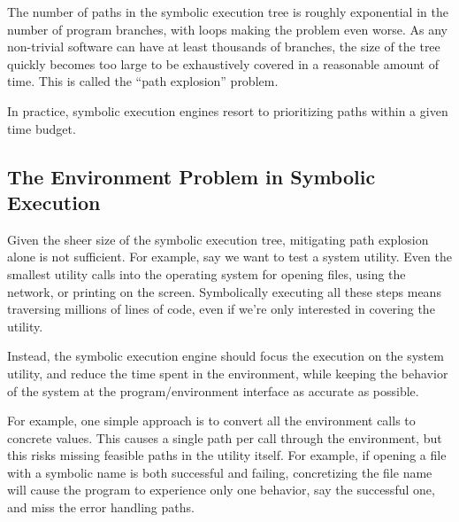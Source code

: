 

The number of paths in the symbolic execution tree is roughly exponential in the number of program branches, with loops making the problem even worse.  As any non-trivial software can have at least thousands of branches, the size of the tree quickly becomes too large to be exhaustively covered in a reasonable amount of time.  This is called the ``path explosion'' problem.

In practice, symbolic execution engines resort to prioritizing paths within a given time budget.


\subsection{The Environment Problem in Symbolic Execution}

Given the sheer size of the symbolic execution tree, mitigating path explosion alone is not sufficient.  For example, say we want to test a system utility.  Even the smallest utility calls into the operating system for opening files, using the network, or printing on the screen.  Symbolically executing all these steps means traversing millions of lines of code, even if we're only interested in covering the utility.

Instead, the symbolic execution engine should focus the execution on the system utility, and reduce the time spent in the environment, while keeping the behavior of the system at the program/environment interface as accurate as possible.

For example, one simple approach is to convert all the environment calls to concrete values.  This causes a single path per call through the environment, but this risks missing feasible paths in the utility itself.  For example, if opening a file with a symbolic name is both successful and failing, concretizing the file name will cause the program to experience only one behavior, say the successful one, and miss the error handling paths.

